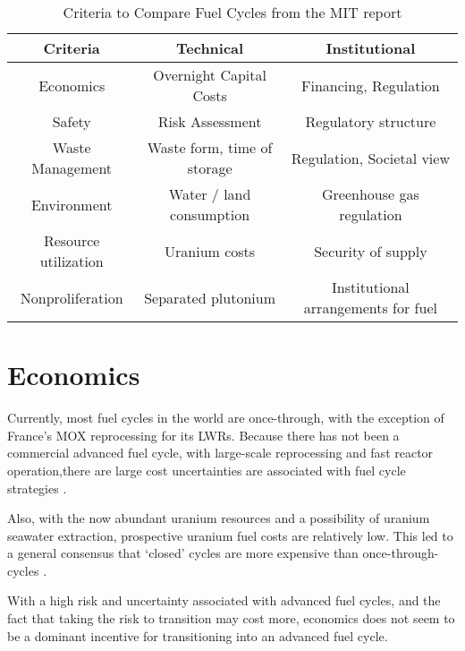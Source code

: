 \begin{table}[h]
    \centering
    \label{tab:mit}
    \caption{Criteria to Compare Fuel Cycles from the MIT report \cite{kazimi_future_2011}}
    \begin{tabular}{ccc}
        \hline
        \textbf{Criteria} & \textbf{Technical} & \textbf{Institutional}\\ \hline
        Economics & Overnight Capital Costs & Financing, Regulation \\
        Safety & Risk Assessment & Regulatory structure \\
        Waste Management & Waste form, time of storage & Regulation, Societal view \\
        Environment & Water / land consumption & Greenhouse gas regulation \\
        Resource utilization & Uranium costs & Security of supply \\
        Nonproliferation & Separated plutonium & Institutional arrangements for fuel \\
        \hline
    \end{tabular}
\end{table}


\FloatBarrier

\section{Economics}
Currently, most fuel cycles in the world are once-through,
with the exception of France's \gls{MOX} reprocessing for its
\glspl{LWR}. Because there has not been a commercial advanced
fuel cycle, with large-scale reprocessing and fast reactor
operation,there are large cost uncertainties are associated
with fuel cycle strategies \cite{d._e._shropshire_advanced_2009}.

Also, with the now abundant uranium resources and a possibility
of uranium seawater extraction, prospective uranium fuel costs are relatively
low. This led to a general consensus that `closed' cycles are
more expensive than once-through-cycles
\cite{d._e._shropshire_advanced_2009, bunn_economics_2004, charpin_economic_2000}.

With a high risk and uncertainty associated with advanced fuel cycles,
and the fact that taking the risk to transition may cost more,
economics does not seem to be a dominant incentive for transitioning
into an advanced fuel cycle. 
